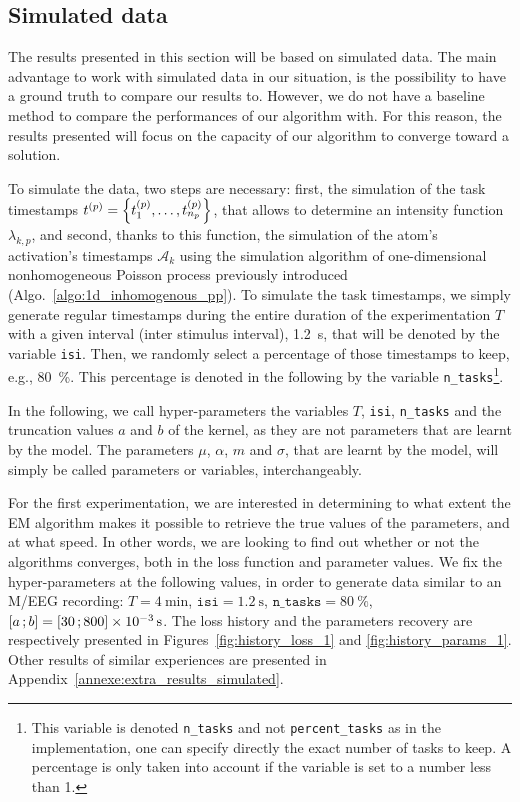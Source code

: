 \subsection{Simulated data}

The results presented in this section will be based on simulated data.
The main advantage to work with simulated data in our situation, is the possibility to have a ground truth to compare our results to.
However, we do not have a baseline method to compare the performances of our algorithm with.
For this reason, the results presented will focus on the capacity of our algorithm to converge toward a solution.

To simulate the data, two steps are necessary: first, the simulation of the task timestamps $t^{(p)} = \left\lbrace t^{(p)}_1, \dots, t^{(p)}_{n_p} \right\rbrace$, that allows to determine an intensity function $\lambda_{k,p}$, and second, thanks to this function, the simulation of the atom's activation's timestamps $\mathcal{A}_k$ using the simulation algorithm of one-dimensional nonhomogeneous Poisson process previously introduced (Algo.~\ref{algo:1d_inhomogenous_pp}).
To simulate the task timestamps, we simply generate regular timestamps during the entire duration of the experimentation $T$ with a given interval (inter stimulus interval), \SI{1.2}{\second}, that will be denoted by the variable \texttt{isi}.
Then, we randomly select a percentage of those timestamps to keep, e.g., \SI{80}{\percent}.
This percentage is denoted in the following by the variable \texttt{n\_tasks}\footnote{This variable is denoted \texttt{n\_tasks} and not \texttt{percent\_tasks} as in the implementation, one can specify directly the exact number of tasks to keep. A percentage is only taken into account if the variable is set to a number less than 1.}.

In the following, we call hyper-parameters the variables $T$, \texttt{isi}, \texttt{n\_tasks} and the truncation values $a$ and $b$ of the kernel, as they are not parameters that are learnt by the model.
The parameters $\mu$, $\alpha$, $m$ and $\sigma$, that are learnt by the model, will simply be called parameters or variables, interchangeably.

For the first experimentation, we are interested in determining to what extent the EM algorithm makes it possible to retrieve the true values of the parameters, and at what speed.
In other words, we are looking to find out whether or not the algorithms converges, both in the loss function and parameter values.
We fix the hyper-parameters at the following values, in order to generate data similar to an M/EEG recording: $T = \SI{4}{\minute}$, $\texttt{isi}=\SI{1.2}{\second}$, $\texttt{n\_tasks} = \SI{80}{\percent}$, $\left[ a \, ; b \right] = \left[ 30 \, ; 800 \right]\times \SI{e-3}{\second}$.
The loss history and the parameters recovery are respectively presented in Figures~\ref{fig:history_loss_1} and \ref{fig:history_params_1}.
Other results of similar experiences are presented in Appendix~\ref{annexe:extra_results_simulated}.

